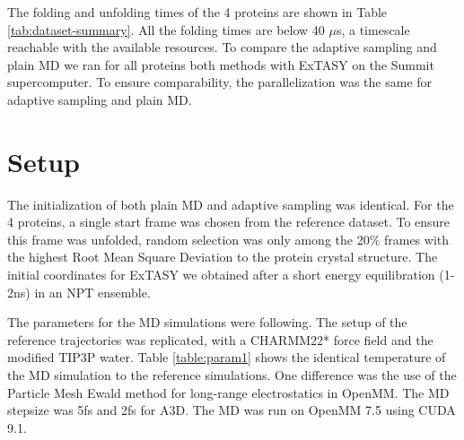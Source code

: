 \begin{table}[H]
\centering
\caption{Proteins for the comparison of adaptive sampling and plain MD. }\label{table:dataset-summary}
\end{table}
The folding and unfolding times of the 4 proteins are shown in Table \ref{tab:dataset-summary}. All the folding times are below 40 $\mu$s, a timescale reachable with the available resources. To compare the adaptive sampling and plain MD we ran for all proteins both methods with ExTASY on the Summit supercomputer. To ensure comparability, the parallelization was the same for adaptive sampling and plain MD.


\section{\label{sec:MD}Setup}

The initialization of both plain MD and adaptive sampling was identical. For the 4 proteins, a single start frame was chosen from the reference dataset. To ensure this frame was unfolded, random selection was only among the 20\% frames with the highest Root Mean Square Deviation to the
protein crystal structure. The initial coordinates for ExTASY we obtained after a short energy equilibration (1-2ns) in an NPT ensemble. 

The parameters for the MD simulations were following. The setup of the reference trajectories\cite{lindorff2011} was replicated, with a CHARMM22* force field \cite{Charmm22star}
and the modified TIP3P water. Table \ref{table:param1} shows the identical temperature of the MD simulation to the reference simulations. One difference was the use of the Particle Mesh Ewald method for long-range electrostatics in OpenMM. The MD stepsize was 5fs and 2fs for A3D. The MD was run on OpenMM 7.5 \cite{openMM} using CUDA 9.1.  

